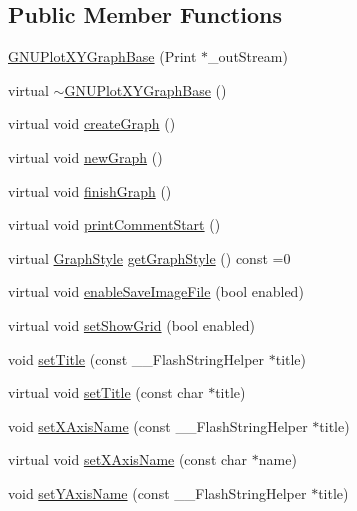 \subsection*{Public Member Functions}
\begin{DoxyCompactItemize}
\item 
\hyperlink{class_g_n_u_plot_x_y_graph_base_a68eed7c5855590fd3b2e696948f071f0}{G\+N\+U\+Plot\+X\+Y\+Graph\+Base} (Print $\ast$\+\_\+out\+Stream)
\item 
virtual \hyperlink{class_g_n_u_plot_x_y_graph_base_a2e03a2909bc036f46aca9b3a86628ada}{$\sim$\+G\+N\+U\+Plot\+X\+Y\+Graph\+Base} ()
\item 
virtual void \hyperlink{class_g_n_u_plot_x_y_graph_base_a8389f830ff330dfb705e00d31053e130}{create\+Graph} ()
\item 
virtual void \hyperlink{class_g_n_u_plot_base_a4d4da234cfdeb99ec3228ef7b2df8a50}{new\+Graph} ()
\item 
virtual void \hyperlink{class_g_n_u_plot_base_aa4b0574c35fbee4dc5f25451eaf956dd}{finish\+Graph} ()
\item 
virtual void \hyperlink{class_g_n_u_plot_base_a219601bd41203477ae73a18d18dd7443}{print\+Comment\+Start} ()
\item 
virtual \hyperlink{_serial_graph_8h_adc73bce6b7e6c4ecf37dde452d6a385e}{Graph\+Style} \hyperlink{class_serial_graph_a2ab97096fffdf429bfa271b9fd4c642a}{get\+Graph\+Style} () const  =0
\item 
virtual void \hyperlink{class_serial_graph_a28b020807c52c113685aa6a31f836c52}{enable\+Save\+Image\+File} (bool enabled)
\item 
virtual void \hyperlink{class_serial_graph_abf488e449d6d786bc01478793d0094ad}{set\+Show\+Grid} (bool enabled)
\item 
void \hyperlink{class_serial_graph_a4db09b008589914b71b2ee8b1873db7a}{set\+Title} (const \+\_\+\+\_\+\+Flash\+String\+Helper $\ast$title)
\item 
virtual void \hyperlink{class_serial_graph_ad726b2c84cec50c2d4bfe769e62a9bcd}{set\+Title} (const char $\ast$title)
\item 
void \hyperlink{class_serial_graph_afdb759a860c41de2fc4cfe78519b9fc0}{set\+X\+Axis\+Name} (const \+\_\+\+\_\+\+Flash\+String\+Helper $\ast$title)
\item 
virtual void \hyperlink{class_serial_graph_ac7f30036f5006091af51204a4d9efaf2}{set\+X\+Axis\+Name} (const char $\ast$name)
\item 
void \hyperlink{class_serial_graph_abfc46c15cf8e1b4362a7f51cb11c7bdb}{set\+Y\+Axis\+Name} (const \+\_\+\+\_\+\+Flash\+String\+Helper $\ast$title)

\end{DoxyCompactItemize}
